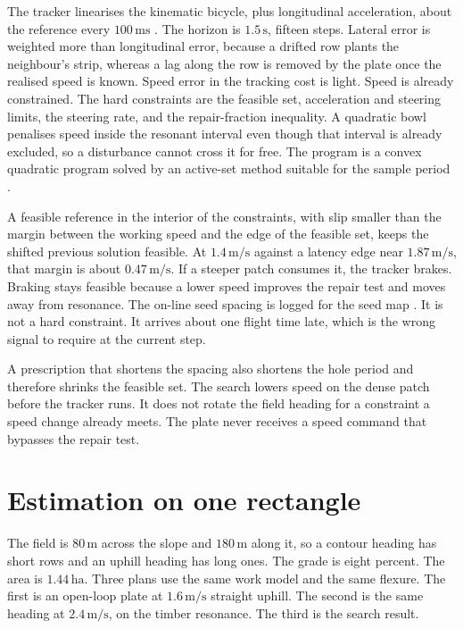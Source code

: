 \documentclass[11pt,a4paper]{article}
\begin{document}
The tracker linearises the kinematic bicycle, plus longitudinal acceleration, about the reference every \(100\,\mathrm{ms}\) \cite{rajamani2012,plessen2017}. The horizon is \(1.5\,\mathrm{s}\), fifteen steps. Lateral error is weighted more than longitudinal error, because a drifted row plants the neighbour's strip, whereas a lag along the row is removed by the plate once the realised speed is known. Speed error in the tracking cost is light. Speed is already constrained. The hard constraints are the feasible set, acceleration and steering limits, the steering rate, and the repair-fraction inequality. A quadratic bowl penalises speed inside the resonant interval even though that interval is already excluded, so a disturbance cannot cross it for free. The program is a convex quadratic program solved by an active-set method suitable for the sample period \cite{ferreau2014,mayne2000}.

A feasible reference in the interior of the constraints, with slip smaller than the margin between the working speed and the edge of the feasible set, keeps the shifted previous solution feasible. At \(1.4\,\mathrm{m/s}\) against a latency edge near \(1.87\,\mathrm{m/s}\), that margin is about \(0.47\,\mathrm{m/s}\). If a steeper patch consumes it, the tracker brakes. Braking stays feasible because a lower speed improves the repair test and moves away from resonance. The on-line seed spacing is logged for the seed map \cite{griepentrog2005}. It is not a hard constraint. It arrives about one flight time late, which is the wrong signal to require at the current step.

A prescription that shortens the spacing also shortens the hole period and therefore shrinks the feasible set. The search lowers speed on the dense patch before the tracker runs. It does not rotate the field heading for a constraint a speed change already meets. The plate never receives a speed command that bypasses the repair test.

\section{Estimation on one rectangle}
The field is \(80\,\mathrm{m}\) across the slope and \(180\,\mathrm{m}\) along it, so a contour heading has short rows and an uphill heading has long ones. The grade is eight percent. The area is \(1.44\,\mathrm{ha}\). Three plans use the same work model and the same flexure. The first is an open-loop plate at \(1.6\,\mathrm{m/s}\) straight uphill. The second is the same heading at \(2.4\,\mathrm{m/s}\), on the timber resonance. The third is the search result.
\end{document}
